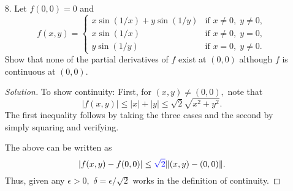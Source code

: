 \documentclass[12pt]{article}
\theoremstyle{definition}
\newenvironment{soln}{\begin{proof}[Solution]}{\end{proof}}
\begin{document}
\begin{itemize}
\begin{soln}
		Thus, we see that $\dfrac{\partial f}{\partial x_1}(0, 0)$ does not exist. A similar computation shows the same for the second partial as well.
	\end{soln}
	\newpage
	\item[8.] Let $f(0, 0) = 0$ and 
	\begin{equation*} 
		f(x, y) = \begin{cases}
			x\sin(1/x) + y\sin(1/y) & \text{if } x \neq 0,\; y \neq 0,\\
			x\sin(1/x) & \text{if } x \neq 0,\; y = 0,\\
			y\sin(1/y) & \text{if } x = 0,\; y \neq 0.
		\end{cases}
	\end{equation*}
	Show that none of the partial derivatives of $f$ exist at $(0, 0)$ although $f$ is continuous at $(0, 0).$
	\begin{soln}
		To show continuity: First, for $(x, y) \neq (0, 0),$ note that
		\begin{equation*} 
			\left|f(x, y)\right| \le \left|x\right| + \left|y\right| \le \sqrt{2}\sqrt{x^2 + y^2}.
		\end{equation*}
		The first inequality follows by taking the three cases and the second by simply squaring and verifying.

		The above can be written as
		\begin{equation*} 
			|f(x, y) - f(0, 0)| \le {\color{myupdatecolor}\sqrt{2}}\|(x, y) - (0, 0)\|.
		\end{equation*}
		Thus, given any $\epsilon > 0,$ $\delta = \epsilon/\sqrt{2}$ works in the definition of continuity.


\end{soln}
\end{itemize}
\end{document}
